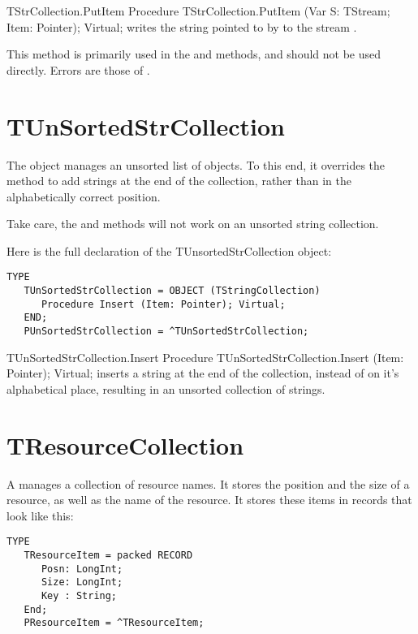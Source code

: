 \begin{procedure}{TStrCollection.PutItem}
\Declaration
Procedure TStrCollection.PutItem (Var S: TStream; Item: Pointer); Virtual;
\Description
{} writes the string pointed to by  to the stream
. 

This method is primarily used in the  and  methods, 
and should not be used directly.
\Errors
Errors are those of .
\SeeAlso
{}
\end{procedure}

\section{TUnSortedStrCollection}
\label{se:TUnSortedStrCollection}

The  object manages an unsorted list of objects.
To this end, it overrides the  method to add
strings at the end of the collection, rather than in the alphabetically
correct position.

Take care, the  and
 methods will not work on an unsorted
string collection.

Here is the full declaration of the {TUnsortedStrCollection} object:
\begin{verbatim}
TYPE
   TUnSortedStrCollection = OBJECT (TStringCollection)
      Procedure Insert (Item: Pointer); Virtual;
   END;
   PUnSortedStrCollection = ^TUnSortedStrCollection;
\end{verbatim}

\begin{procedure}{TUnSortedStrCollection.Insert}
\Declaration
Procedure TUnSortedStrCollection.Insert (Item: Pointer); Virtual;
\Description
{} inserts a string at the end of the collection, instead
of on it's alphabetical place, resulting in an unsorted collection of
strings. 
\Errors
\SeeAlso
\end{procedure}

\section{TResourceCollection}
\label{se:TResourceCollection}

A  manages a collection of resource names. 
It stores the position and the size of a resource, as well as the name of
the resource. It stores these items in records that look like this:
\begin{verbatim}
TYPE
   TResourceItem = packed RECORD
      Posn: LongInt;
      Size: LongInt;
      Key : String;
   End;
   PResourceItem = ^TResourceItem;
\end{verbatim}

